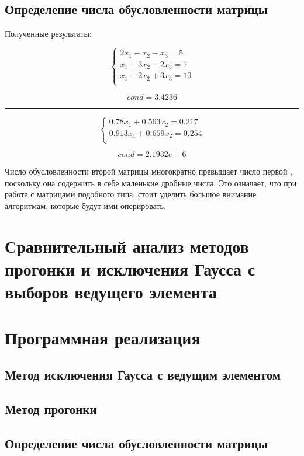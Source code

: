 \documentclass{article}
\begin{document}
\subsection{Определение числа обусловленности матрицы}
Полученные результаты:
\begin{multicols}{2}
\begin{displaymath}
  \left\{ \begin{array}{ll}
  2x_{1} - x_{2} - x_{3}= 5\\
  x_{1} + 3x_{2} - 2x_{3} = 7\\
  x_{1} + 2x_{2} + 3x_{3} = 10\\
\end{array} \right.
\end{displaymath}

\begin{displaymath}
  cond = 3.4236
\end{displaymath}
\end{multicols}
\rule[1mm]{10cm}{0.1mm}
\begin{multicols}{2}
\begin{displaymath}
  \left\{ \begin{array}{ll}
  0.78x_{1} + 0.563x_{2} = 0.217\\
  0.913x_{1} + 0.659x_{2} = 0.254\\
\end{array} \right.
\end{displaymath}

\begin{displaymath}
  cond = 2.1932e+6
\end{displaymath}
\end{multicols}
Число обусловленности второй матрицы многократно превышает число первой
, поскольку она содержить в себе маленькие дробные числа.
Это означает, что при работе с матрицами подобного типа, стоит уделить
большое внимание алгоритмам, которые будут ими оперировать.

 \section{Сравнительный анализ методов прогонки и исключения Гаусса с
выборов ведущего элемента}

\section{Программная реализация}
\subsection{Метод исключения Гаусса с ведущим элементом}
\subsection{Метод прогонки}
\subsection{Определение числа обусловленности матрицы}
\end{document}

